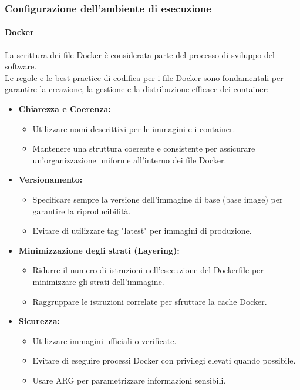 \subsubsection{Configurazione dell'ambiente di esecuzione}
\paragraph{Docker}

La scrittura dei file Docker è considerata parte del processo di sviluppo del software. \\
Le regole e le best practice di codifica per i file Docker sono fondamentali per garantire la creazione, la gestione e la distribuzione efficace dei container:
\begin{itemize}
    \item \textbf{Chiarezza e Coerenza:}
    \begin{itemize}
        \item Utilizzare nomi descrittivi per le immagini e i container.
        \item Mantenere una struttura coerente e consistente per assicurare un'organizzazione uniforme all'interno dei file Docker.
    \end{itemize}

\item \textbf{Versionamento:}
    \begin{itemize}
        \item Specificare sempre la versione dell'immagine di base (base image) per garantire la riproducibilità.
        \item Evitare di utilizzare tag "latest" per immagini di produzione.
    \end{itemize}

\item \textbf{Minimizzazione degli strati (Layering):}
    \begin{itemize}
        \item Ridurre il numero di istruzioni nell'esecuzione del Dockerfile per minimizzare gli strati dell'immagine.
        \item Raggruppare le istruzioni correlate per sfruttare la cache Docker.
    \end{itemize}

\item \textbf{Sicurezza:}
    \begin{itemize}
        \item Utilizzare immagini ufficiali o verificate.
        \item Evitare di eseguire processi Docker con privilegi elevati quando possibile.
        \item Usare ARG per parametrizzare informazioni sensibili.
    \end{itemize}


\end{itemize}
